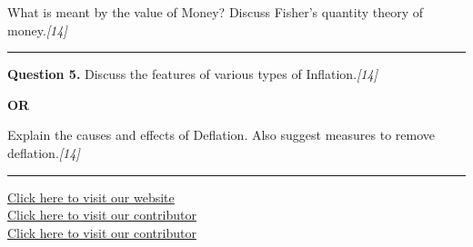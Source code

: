\documentclass[11pt,a4paper]{article}
\newcommand{\pts}[1]{\hfill   \textit{[#1]}}
\begin{document}
What is meant by the value of Money? Discuss Fisher's quantity theory of money.\pts{14}

\medskip\rule{\linewidth}{0.2pt}




\noindent   \textbf{Question 5.}
Discuss the features of various types of Inflation.\pts{14}

\centerline{   \textbf{OR}}

Explain the causes and effects of Deflation. Also suggest measures to remove deflation.\pts{14}

\vfill
\rule{\linewidth}{0.4pt}

\begin{center}\small
\href{https://bhu-exam.vercel.app/}{Click here to visit our website}\\[4pt]
\href{https://me-aryan.vercel.app/}{Click here to visit our contributor}\\[4pt]
\href{https://quashan-me.vercel.app/}{Click here to visit our contributor}
\end{center}
\end{document}
